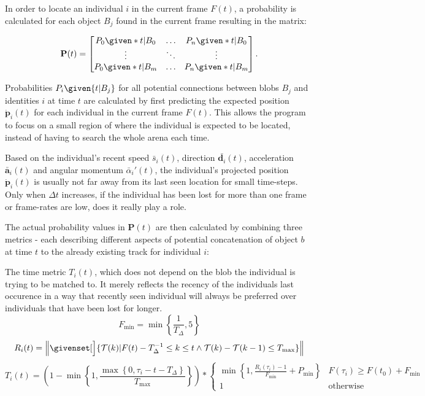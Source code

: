 \documentclass[9pt,lineno]{elife}
\newcommand{\norm}[1]{\left\lVert#1\right\rVert}
\newcommand*\mean[1]{\bar{#1}}
\newcommand{\Tau}{\mathcal{T}}
\begin{document}
\begin{appendixbox}
In order to locate an individual $i$ in the current frame $F(t)$, a probability is calculated for each object $B_j$ found in the current frame resulting in the matrix:

\begin{equation}
    \mathbf{P}(t) = \begin{bmatrix}
      P_0\given*{t|B_0} & \dots & P_{n}\given*{t|B_0} \\
     \vdots   & \ddots  & \vdots \\
      P_{0}\given*{t|B_m}  & \dots  & P_{n}\given*{t| B_m}
    \end{bmatrix}.
\end{equation}

Probabilities $P_{i}\given{t|B_j}$ for all potential connections between blobs $B_j$ and identities $i$ at time $t$ are calculated by first predicting the expected position $\dot{\mathbf{p}}_{i}(t)$ for each individual in the current frame $F(t)$. This allows the program to focus on a small region of where the individual is expected to be located, instead of having to search the whole arena each time.

Based on the individual's recent speed $\mean{s}_{i}(t)$, direction $\mean{\mathbf{d}_i}(t)$, acceleration $ \mean{\mathbf{a}}_{i}(t)$ and angular momentum $\mean{\alpha}_{i}'(t)$, the individual's projected position $\dot{\mathbf{p}}_{i}(t)$ is usually not far away from its last seen location for small time-steps. Only when $\Delta t$ increases, if the individual has been lost for more than one frame or frame-rates are low, does it really play a role.

The actual probability values in $\mathbf{P}(t)$ are then calculated by combining three metrics - each describing different aspects of potential concatenation of object $b$ at time $t$ to the already existing track for individual $i$:

The time metric $T_i(t)$, which does not depend on the blob the individual is trying to be matched to. It merely reflects the recency of the individuals last occurence in a way that recently seen individual will always be preferred over individuals that have been lost for longer.
    $$ F_\mathrm{min} = \min\left\{\frac{1}{T_\Delta}, 5\right\} $$
    $$ R_i(t) = \norm{ \givenset[\Big]{ \Tau(k) | F(t) - T_\Delta^{-1} \leq k \leq t \wedge \Tau(k) - \Tau(k-1) \leq T_\mathrm{max}} } $$
    \begin{equation} \label{eq:time_prob}
    T_i(t) = \left(1 - \min\left\{ 1, \frac{\max\left\{ 0, \tau_i - t - T_\Delta \right\}} {T_\mathrm{max}} \right\}\right) * \begin{cases}
            \min\left\{ 1, \frac{R_i(\tau_i) - 1}{F_\mathrm{min}} + P_\mathrm{min} \right\} & F(\tau_i) \geq F(t_0) + F_\mathrm{min}\\
            1 & \mathrm{otherwise}
        \end{cases}
    \end{equation}
    

\end{appendixbox}
\end{document}
